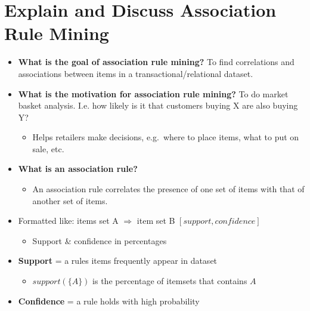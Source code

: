 
\section{Explain and Discuss Association Rule Mining}
\begin{multicols}{2}
\begin{itemize}
\item
  \textbf{What is the goal of association rule mining?} To find
  correlations and associations between items in a
  transactional/relational dataset.
\item
  \textbf{What is the motivation for association rule mining?} To do
  market basket analysis. I.e. how likely is it that customers buying X
  are also buying Y?

  \begin{itemize}
    \item
    Helps retailers make decisions, e.g.~where to place items, what to
    put on sale, etc.
  \end{itemize}
\item
  \textbf{What is an association rule?}

  \begin{itemize}
    \item
    An association rule correlates the presence of one set of items with
    that of another set of items.
  \end{itemize}
\item
  Formatted like: items set A \(\Rightarrow\) item set B
  \([support, confidence]\)

  \begin{itemize}
    \item
    Support \& confidence in percentages
  \end{itemize}
\item
  \textbf{Support} = a rules items frequently appear in dataset

  \begin{itemize}
    \item
    \(support(\{A\})\) is the percentage of itemsets that contains \(A\)
  \end{itemize}
\item
  \textbf{Confidence} = a rule holds with high probability


\end{itemize}
\end{multicols}
